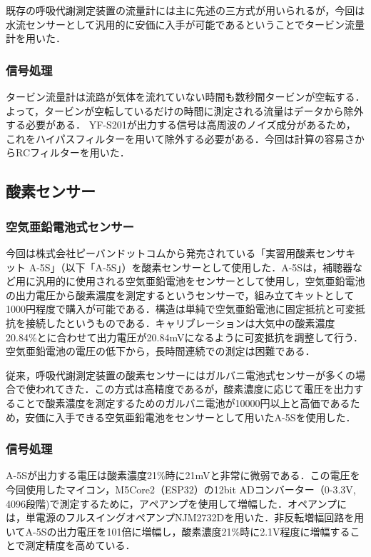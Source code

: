 
既存の呼吸代謝測定装置の流量計には主に先述の三方式が用いられるが，今回は水流センサーとして汎用的に安価に入手が可能であるということでタービン流量計を用いた．

\subsubsection{信号処理}

タービン流量計は流路が気体を流れていない時間も数秒間タービンが空転する．よって，タービンが空転しているだけの時間に測定される流量はデータから除外する必要がある．
YF-S201が出力する信号は高周波のノイズ成分があるため，これをハイパスフィルターを用いて除外する必要がある．今回は計算の容易さからRCフィルターを用いた．

\subsection{酸素センサー}

\subsubsection{空気亜鉛電池式センサー}

今回は株式会社ピーバンドットコムから発売されている「実習用酸素センサキット A-5S」（以下「A-5S」）を酸素センサーとして使用した．A-5Sは，補聴器など用に汎用的に使用される空気亜鉛電池をセンサーとして使用し，空気亜鉛電池の出力電圧から酸素濃度を測定するというセンサーで，組み立てキットとして1000円程度で購入が可能である．構造は単純で空気亜鉛電池に固定抵抗と可変抵抗を接続したというものである．キャリブレーションは大気中の酸素濃度20.84\%とに合わせて出力電圧が20.84mVになるように可変抵抗を調整して行う．空気亜鉛電池の電圧の低下から，長時間連続での測定は困難である．

従来，呼吸代謝測定装置の酸素センサーにはガルバニ電池式センサーが多くの場合で使われてきた．この方式は高精度であるが，酸素濃度に応じて電圧を出力することで酸素濃度を測定するためのガルバニ電池が10000円以上と高価であるため，安価に入手できる空気亜鉛電池をセンサーとして用いたA-5Sを使用した．

\subsubsection{信号処理}

A-5Sが出力する電圧は酸素濃度21\%時に21mVと非常に微弱である．この電圧を今回使用したマイコン，M5Core2（ESP32）の12bit ADコンバーター（0-3.3V, 4096段階)で測定するために，アペアンプを使用して増幅した．オペアンプには，単電源のフルスイングオペアンプNJM2732Dを用いた．非反転増幅回路を用いてA-5Sの出力電圧を101倍に増幅し，酸素濃度21\%時に2.1V程度に増幅することで測定精度を高めている．

